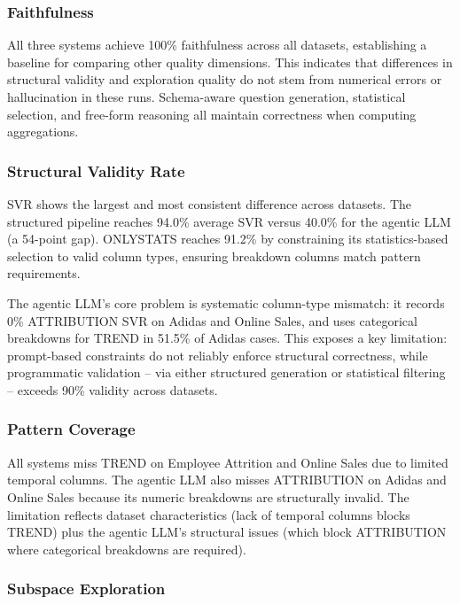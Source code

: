 \documentclass[conference]{IEEEtran}
\begin{document}
\subsubsection{Faithfulness}

All three systems achieve 100\% faithfulness across all datasets, establishing a baseline for comparing other quality dimensions. This indicates that differences in structural validity and exploration quality do not stem from numerical errors or hallucination in these runs. Schema-aware question generation, statistical selection, and free-form reasoning all maintain correctness when computing aggregations.

\subsubsection{Structural Validity Rate}

SVR shows the largest and most consistent difference across datasets. The structured pipeline reaches 94.0\% average SVR versus 40.0\% for the agentic LLM (a 54-point gap). ONLYSTATS reaches 91.2\% by constraining its statistics-based selection to valid column types, ensuring breakdown columns match pattern requirements.

The agentic LLM's core problem is systematic column-type mismatch: it records 0\% ATTRIBUTION SVR on Adidas and Online Sales, and uses categorical breakdowns for TREND in 51.5\% of Adidas cases. This exposes a key limitation: prompt-based constraints do not reliably enforce structural correctness, while programmatic validation -- via either structured generation or statistical filtering -- exceeds 90\% validity across datasets.

\subsubsection{Pattern Coverage}

All systems miss TREND on Employee Attrition and Online Sales due to limited temporal columns. The agentic LLM also misses ATTRIBUTION on Adidas and Online Sales because its numeric breakdowns are structurally invalid. The limitation reflects dataset characteristics (lack of temporal columns blocks TREND) plus the agentic LLM's structural issues (which block ATTRIBUTION where categorical breakdowns are required).

\subsubsection{Subspace Exploration}
\end{document}
